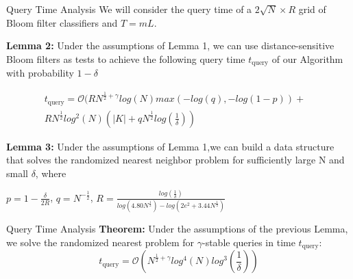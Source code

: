 \documentclass[Serif, 10pt, brown]{beamer}
\theoremstyle{example}
\theoremstyle{plain}
\begin{document}
\begin{frame}{Query Time Analysis}
	We will consider the query time of a $2\sqrt{N}\times R$ grid of Bloom filter classifiers and $T = mL$.

	\textbf{Lemma 2:} Under the assumptions of Lemma 1, we can use distance-sensitive Bloom filters as tests to achieve the following query time $t_\text{query}$ of our Algorithm with probability $1 - \delta$

	\[
	\begin{aligned}
		t_\text{query} =
		\mathcal{O}(RN^{\frac{1}{2} + \gamma}log(N) max(-log(q), -log(1-p)) 
	+ {} & \\
	RN^{\frac{1}{2}} log^2(N)(|K|+ qN^{\frac{1}{2}}log(\frac{1}{\delta})) &
	\end{aligned}
	\]

	\textbf{Lemma 3:} Under the assumptions of Lemma 1,we can build a data structure that solves the randomized nearest neighbor problem for sufficiently large N and small $\delta$, where

	$p = 1 - \frac{\delta}{2R}$, $q = N^{-\frac{1}{2}}$, $R = \frac{log(\frac{1}{\delta})}{log(4.80N^{\frac{1}{2}}) - log(2e^2 + 3.44N^{\frac{1}{2}})}$
\end{frame}

\begin{frame}{Query Time Analysis}
	\textbf{Theorem:} Under the assumptions of the previous Lemma, we solve the randomized nearest problem for $\gamma$-stable queries in time $t_\text{query}$:
	\[
		t_\text{query} = \mathcal{O}(N^{\frac{1}{2} + \gamma}log^4(N)log^3(\frac{1}{\delta}))
	\]
	
\end{frame}

	
\end{document}
